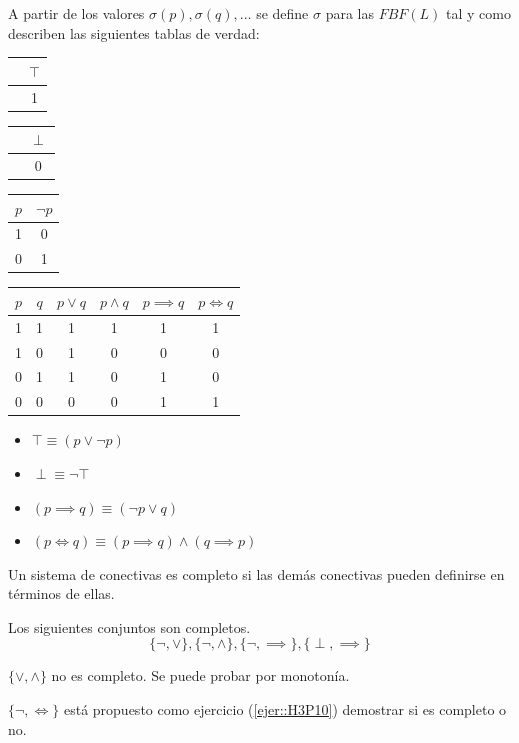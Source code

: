 A partir de los valores $\sigma(p), \sigma(q),\hdots$ se define $\sigma$ para las $FBF(L)$ tal y como describen las siguientes tablas de verdad:
\begin{center}
\begin{tabular}{c|c}
	& $\top$\\
	\hline
	& 1 \\
\end{tabular}\hspace{1cm}
\begin{tabular}{c|c}
	& $\perp$\\
	\hline
	& 0 \\
\end{tabular}\hspace{1cm}
\begin{tabular}{|c|c|}
	\hline
	$p$ & $\neg p$\\
	\hline
	1 & 0 \\
	\hline
	0 & 1\\
	\hline
\end{tabular}

\begin{tabular}{|c|c|c|c|c|c|}
	\hline
	$p$ & $q$ & $p\vee q$ & $p \wedge q$ & $p\implies q$ &  $p\iff q$\\
	\hline
	1 & 1 & 1 & 1 & 1 & 1 \\
	\hline
	1 & 0 & 1 & 0 & 0 & 0 \\
	\hline
	0 & 1 & 1 & 0 & 1 & 0 \\
	\hline
	0 & 0 & 0 & 0 & 1 & 1 \\
	\hline
\end{tabular}
\end{center}

\begin{obs}
	\begin{itemize}
	\item $\top \equiv (p\vee \neg p)$
	\item $\perp \equiv \neg \top $
	\item $(p\implies q) \equiv (\neg p \vee q)$
	\item $(p\iff q) \equiv (p\implies q)\wedge (q \implies p)$
	\end{itemize}
\end{obs}

\begin{defn}
	Un sistema de conectivas es completo si las demás conectivas pueden definirse en términos de ellas.
\end{defn}

\begin{example}
	Los siguientes conjuntos son completos.
	$$\{\neg, \vee\}, \{\neg, \wedge\}, \{\neg, \implies\}, \{\perp, \implies\}$$

	$\{\vee,\wedge\}$ no es completo. Se puede probar por monotonía.

	$\{\neg, \iff\}$ está propuesto como ejercicio (\ref{ejer::H3P10}) demostrar si es completo o no.
\end{example}

